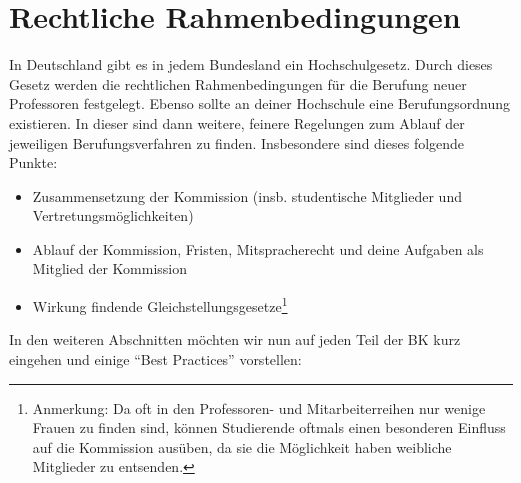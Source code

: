\documentclass[10pt,twoside,a5paper,openright]{book}
\begin{document}
\section{Rechtliche Rahmenbedingungen}%
In Deutschland gibt es in jedem Bundesland ein Hochschulgesetz. Durch dieses Gesetz werden die rechtlichen Rahmenbedingungen für die Berufung neuer Professoren festgelegt. Ebenso sollte an deiner Hochschule eine Berufungsordnung existieren. In dieser sind dann weitere, feinere Regelungen zum Ablauf der jeweiligen Berufungsverfahren zu finden. Insbesondere sind dieses folgende Punkte:
\begin{itemize}
	\item Zusammensetzung der Kommission (insb. studentische Mitglieder und Vertretungsmöglichkeiten)
	\item Ablauf der Kommission, Fristen, Mitspracherecht und deine Aufgaben als Mitglied der Kommission
	\item Wirkung findende Gleichstellungsgesetze\footnote{Anmerkung: Da oft in den Professoren- und Mitarbeiterreihen nur wenige Frauen zu finden sind, können Studierende oftmals einen besonderen Einfluss auf die Kommission ausüben, da sie die Möglichkeit haben weibliche Mitglieder zu entsenden.}
\end{itemize}
In den weiteren Abschnitten möchten wir nun auf jeden Teil der BK kurz eingehen und einige "`Best Practices"' vorstellen:  
\end{document}
